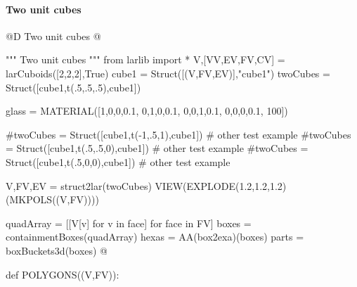 \documentclass[11pt,oneside]{article}    %
\begin{document}
\paragraph{Two unit cubes}
@D Two unit cubes 
@{""" Two unit cubes """
from larlib import *
V,[VV,EV,FV,CV] = larCuboids([2,2,2],True)
cube1 = Struct([(V,FV,EV)],"cube1")
twoCubes = Struct([cube1,t(.5,.5,.5),cube1])

glass = MATERIAL([1,0,0,0.1,  0,1,0,0.1,  0,0,1,0.1, 0,0,0,0.1, 100])

#twoCubes = Struct([cube1,t(-1,.5,1),cube1])     # other test example
#twoCubes = Struct([cube1,t(.5,.5,0),cube1])    # other test example
#twoCubes = Struct([cube1,t(.5,0,0),cube1])        # other test example

V,FV,EV = struct2lar(twoCubes)
VIEW(EXPLODE(1.2,1.2,1.2)(MKPOLS((V,FV))))

quadArray = [[V[v] for v in face] for face in FV]
boxes = containmentBoxes(quadArray)
hexas = AA(box2exa)(boxes)
parts = boxBuckets3d(boxes)
@}


def POLYGONS((V,FV)):
\end{document}
